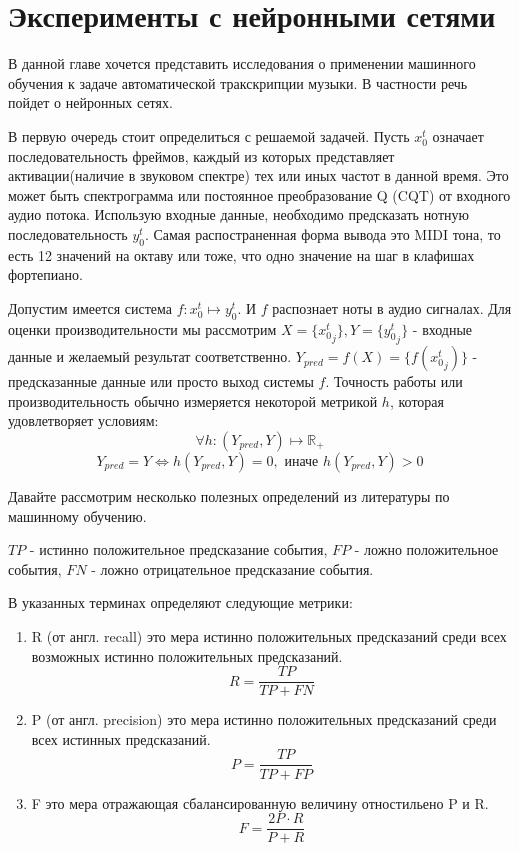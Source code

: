 \section{Эксперименты с нейронными сетями}

В данной главе хочется представить исследования о применении машинного обучения
к задаче автоматической тракскрипции музыки. В частности речь пойдет о
нейронных сетях.

В первую очередь стоит определиться с решаемой задачей.
Пусть $x_0^t$ означает последовательность фреймов, каждый из которых
представляет активации(наличие в звуковом спектре)
тех или иных частот в данной время. Это может быть спектрограмма или
постоянное преобразование Q (CQT) от входного аудио потока.
Использую входные данные, необходимо предсказать нотную последовательность
$y_0^t$. Самая распостраненная форма вывода это MIDI тона, то есть
12 значений на октаву или тоже, что одно значение на шаг в клафишах фортепиано.

Допустим имеется система $f: x_0^t \mapsto y_0^t$. И $f$ распознает ноты
в аудио сигналах. Для оценки производительности мы рассмотрим
$X = \{{x_0 ^t}_j\}, Y = \{{y_0^t}_j\}$ - входные данные и желаемый результат
соответственно. $Y_{pred}=f(X)=\{f({x_0^t}_j)\}$ - предсказанные данные
или просто выход системы $f$. Точность работы или производительность
обычно измеряется некоторой метрикой $h$, которая удовлетворяет условиям:
\[
  \forall h: (Y_{pred}, Y) \mapsto \mathbb{R}_{+}
\]
\[
  Y_{pred} = Y \iff h(Y_{pred}, Y) = 0, \text{ иначе } h(Y_{pred}, Y) > 0
\]

Давайте рассмотрим несколько полезных определений из литературы по
машинному обучению.

$TP$ - истинно положительное предсказание события, $FP$ -  ложно положительное
события, $FN$ - ложно отрицательное предсказание события.

В указанных терминах определяют следующие метрики:
\begin{enumerate}
  \item R (от англ. recall) это мера истинно положительных предсказаний среди всех
    возможных истинно положительных предсказаний.
    \[
      R = \frac{TP}{TP + FN}
    \]
  \item P (от англ. precision) это мера истинно положительных предсказаний
    среди всех истинных предсказаний.
    \[
      P = \frac{TP}{TP + FP}
    \]
  \item F это мера отражающая сбалансированную величину отностильено P и R.
    \[
      F = \frac{2 P \cdot R}{P + R}
    \]
\end{enumerate}

